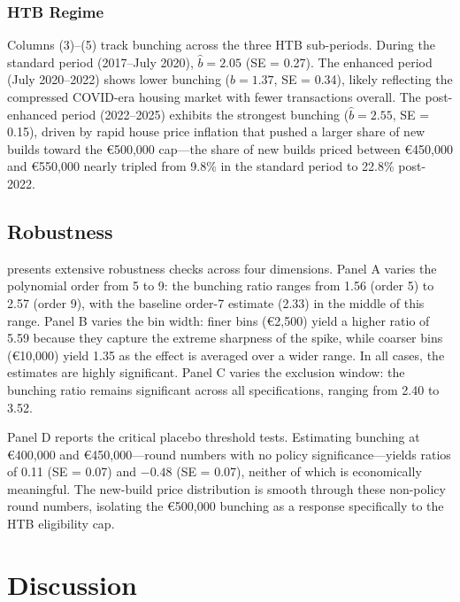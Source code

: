\documentclass[12pt]{article}
\newcommand{\eur}[1]{\euro{}#1}
\begin{document}
\subsubsection*{HTB Regime} Columns (3)--(5) track bunching across the three HTB sub-periods. During the standard period (2017--July 2020), $\hat{b} = 2.05$ (SE = 0.27). The enhanced period (July 2020--2022) shows lower bunching ($\hat{b} = 1.37$, SE = 0.34), likely reflecting the compressed COVID-era housing market with fewer transactions overall. The post-enhanced period (2022--2025) exhibits the strongest bunching ($\hat{b} = 2.55$, SE = 0.15), driven by rapid house price inflation that pushed a larger share of new builds toward the \eur{500,000} cap---the share of new builds priced between \eur{450,000} and \eur{550,000} nearly tripled from 9.8\% in the standard period to 22.8\% post-2022.



\subsection{Robustness}

 presents extensive robustness checks across four dimensions. Panel A varies the polynomial order from 5 to 9: the bunching ratio ranges from 1.56 (order 5) to 2.57 (order 9), with the baseline order-7 estimate (2.33) in the middle of this range. Panel B varies the bin width: finer bins (\eur{2,500}) yield a higher ratio of 5.59 because they capture the extreme sharpness of the spike, while coarser bins (\eur{10,000}) yield 1.35 as the effect is averaged over a wider range. In all cases, the estimates are highly significant. Panel C varies the exclusion window: the bunching ratio remains significant across all specifications, ranging from 2.40 to 3.52.

Panel D reports the critical placebo threshold tests. Estimating bunching at \eur{400,000} and \eur{450,000}---round numbers with no policy significance---yields ratios of 0.11 (SE = 0.07) and $-0.48$ (SE = 0.07), neither of which is economically meaningful. The new-build price distribution is smooth through these non-policy round numbers, isolating the \eur{500,000} bunching as a response specifically to the HTB eligibility cap.




\section{Discussion}
\end{document}
